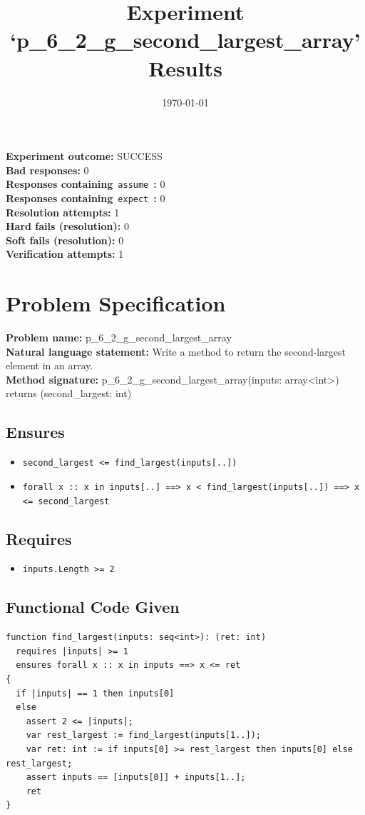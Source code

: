 \documentclass{article}
\begin{document}
\title{Experiment `p\_6\_2\_g\_second\_largest\_array' Results}
\author{\today}
\date{}
\maketitle
\textbf{Experiment outcome: }SUCCESS
\\\textbf{Bad responses: }0
\\\textbf{Responses containing}~\texttt{assume}~\textbf{: }0
\\\textbf{Responses containing}~\texttt{expect}~\textbf{: }0
\\\textbf{Resolution attempts: }1
\\\textbf{Hard fails (resolution): }0
\\\textbf{Soft fails (resolution): }0
\\\textbf{Verification attempts: }1
\section*{Problem Specification}
\textbf{Problem name: }p\_6\_2\_g\_second\_largest\_array
\\\textbf{Natural language statement: }Write a method to return the second-largest element in an array.
\\\textbf{Method signature: }p\_6\_2\_g\_second\_largest\_array(inputs: array<int>) returns (second\_largest: int)
\subsection*{Ensures}
\begin{itemize}
\item \texttt{second\_largest <= find\_largest(inputs[..])}
\item \texttt{forall x :: x in inputs[..] ==> x < find\_largest(inputs[..]) ==> x <= second\_largest}
\end{itemize}
\subsection*{Requires}
\begin{itemize}
\item \texttt{inputs.Length >= 2}
\end{itemize}
\subsection*{Functional Code Given}
\begin{lstlisting}
function find_largest(inputs: seq<int>): (ret: int)
  requires |inputs| >= 1
  ensures forall x :: x in inputs ==> x <= ret
{
  if |inputs| == 1 then inputs[0]
  else 
    assert 2 <= |inputs|;
    var rest_largest := find_largest(inputs[1..]);
    var ret: int := if inputs[0] >= rest_largest then inputs[0] else rest_largest;
    assert inputs == [inputs[0]] + inputs[1..]; 
    ret 
} 
\end{lstlisting}
\clearpage
\end{document}
